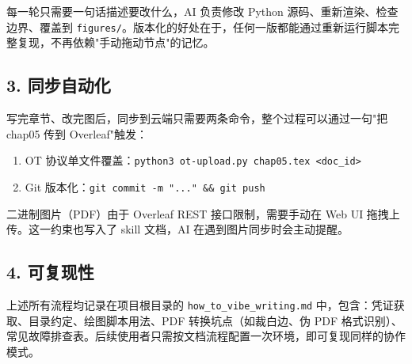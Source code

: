 \begin{acknowledgements}
每一轮只需要一句话描述要改什么，AI 负责修改 Python 源码、重新渲染、检查边界、覆盖到 \texttt{figures/}。版本化的好处在于，任何一版都能通过重新运行脚本完整复现，不再依赖"手动拖动节点"的记忆。

\subsection*{3. 同步自动化}

写完章节、改完图后，同步到云端只需要两条命令，整个过程可以通过一句"把 chap05 传到 Overleaf"触发：

\begin{enumerate}
    \item OT 协议单文件覆盖：\texttt{python3 ot-upload.py chap05.tex <doc\_id>}
    \item Git 版本化：\texttt{git commit -m "..." \&\& git push}
\end{enumerate}

二进制图片（PDF）由于 Overleaf REST 接口限制，需要手动在 Web UI 拖拽上传。这一约束也写入了 skill 文档，AI 在遇到图片同步时会主动提醒。

\subsection*{4. 可复现性}

上述所有流程均记录在项目根目录的 \texttt{how\_to\_vibe\_writing.md} 中，包含：凭证获取、目录约定、绘图脚本用法、PDF 转换坑点（如裁白边、伪 PDF 格式识别）、常见故障排查表。后续使用者只需按文档流程配置一次环境，即可复现同样的协作模式。

\end{acknowledgements}
